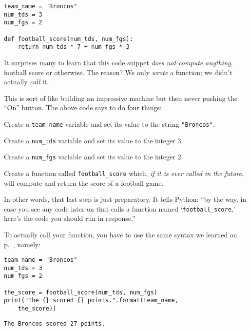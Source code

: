 \begin{Verbatim}[fontsize=\small,samepage=true,frame=single,framesep=3mm]
team_name = "Broncos"
num_tds = 3
num_fgs = 2

def football_score(num_tds, num_fgs):
    return num_tds * 7 + num_fgs * 3
\end{Verbatim}

It surprises many to learn that this code snippet \textit{does not compute
anything}, football score or otherwise. The reason? We only \textit{wrote} a
function; we didn't actually \textit{call} it.

This is sort of like building an impressive machine but then never pushing the
``On'' button. The above code says to do four things:

\begin{compactenum}
\item Create a \texttt{team\_name} variable and set its value to the string
\texttt{"Broncos"}.
\item Create a \texttt{num\_tds} variable and set its value to the integer 3.
\item Create a \texttt{num\_fgs} variable and set its value to the integer 2.
\item Create a function called \texttt{football\_score} which, \textit{if it is
ever called in the future}, will compute and return the score of a football
game.
\end{compactenum}

In other words, that last step is just preparatory. It tells Python: ``by the
way, in case you see any code later on that calls a function named
`\texttt{football\_score},' here's the code you should run in response.''

To actually call your function, you have to use the same syntax we learned on
p.~\pageref{function}, namely:

\begin{Verbatim}[fontsize=\small,samepage=true,frame=single,framesep=3mm]
team_name = "Broncos"
num_tds = 3
num_fgs = 2

the_score = football_score(num_tds, num_fgs)
print("The {} scored {} points.".format(team_name,
    the_score))
\end{Verbatim}
\vspace{-.2in}

\begin{Verbatim}[fontsize=\small,samepage=true,frame=leftline,framesep=5mm,framerule=1mm]
The Broncos scored 27 points.
\end{Verbatim}

